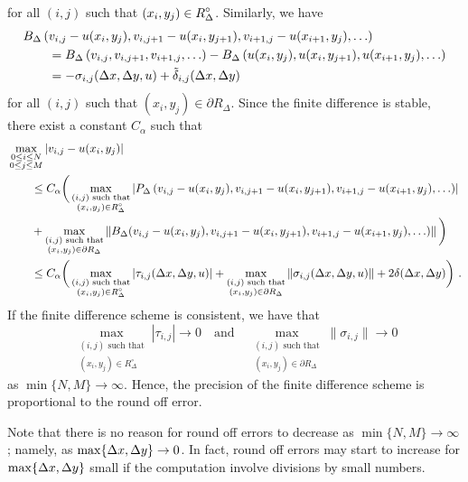 for all $(i,j)$ such that $\displaystyle (x_i,y_j) \in R^\circ_\Delta$.
Similarly, we have
\begin{align*}
&B_\Delta\left(v_{i,j}-u(x_i,y_j), v_{i,j+1}-u(x_i,y_{j+1}),
v_{i+1,j}-u(x_{i+1},y_j), \ldots\right) \\
&\qquad = B_\Delta\left(v_{i,j}, v_{i,j+1}, v_{i+1,j}, \ldots\right) - 
B_\Delta\left(u(x_i,y_j), u(x_i,y_{j+1}), u(x_{i+1},y_j), \ldots \right)  \\
&\qquad
= -\sigma_{i,j}(\Delta{x},\Delta{y},u) + \tilde{\delta}_{i,j}(\Delta{x},\Delta{y})
\end{align*}
for all $(i,j)$ such that $(x_i,y_j) \in \partial R_\Delta$.  Since
the finite difference is stable, there exist a constant $C_\alpha$ such that
\begin{align*}
&\max_{\substack{0\leq i\leq N\\0\leq j \leq M}} |v_{i,j} - u(x_i,y_j)| \\
&\qquad \leq C_\alpha \bigg(
\max_{\substack{(i,j) \text{ such that}\\(x_i,y_j)\in R^\circ_\Delta}}
\left| P_\Delta\left(v_{i,j}-u(x_i,y_j), v_{i,j+1}-u(x_i,y_{j+1}),
v_{i+1,j}- u(x_{i+1},y_j),\ldots\right) \right| \\
&\qquad
+ \max_{\substack{(i,j) \text{ such that}\\ (x_i,y_j)\in \partial R_\Delta}}
\left\| B_\Delta(v_{i,j}-u(x_i,y_j),v_{i,j+1}-u(x_i,y_{j+1}),v_{i+1,j}
  -u(x_{i+1},y_j), \ldots) \right\| \bigg) \\
& \qquad \leq C_\alpha \bigg(  
\max_{\substack{(i,j) \text{ such that}\\(x_i,y_j) \in R^\circ_\Delta}}
|\tau_{i,j}(\dtx{x},\dtx{y},u)|
+\max_{\substack{(i,j) \text{ such that}\\(x_i,y_j) \in \partial R_\Delta}}
\|\sigma_{i,j}(\dtx{x},\dtx{y},u)\| + 2 \delta(\dtx{x},\dtx{y}) \bigg) \ .
\end{align*}
If the finite difference scheme is consistent, we have that
\[
\max_{\substack{(i,j) \text{ such that}\\(x_i,y_j) \in R^\circ_\Delta}}
|\tau_{i,j}| \to 0 \quad \text{and} \quad
\max_{\substack{(i,j) \text{ such that}\\(x_i,y_j) \in \partial R_\Delta}}
\|\sigma_{i,j}\| \to 0
\]
as $\min \{N, M\} \rightarrow \infty$.  Hence, the precision of the
finite difference scheme is proportional to the round off error.

Note that there is no reason for round off errors to decrease as
$\min \{N, M\} \rightarrow \infty$; namely, as
$\max\{\Delta{x},\Delta{y}\} \to 0$.   In fact, round off errors may
start to increase for $\max\{\Delta{x},\Delta{y}\}$ small if the
computation involve divisions by small numbers.

